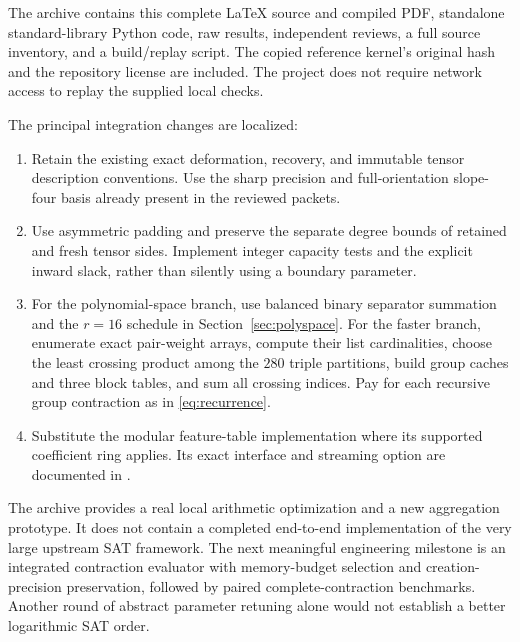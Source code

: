 \documentclass[11pt]{article}
\theoremstyle{definition}\newtheorem{definition}[theorem]{Definition}
\theoremstyle{remark}\newtheorem{remark}[theorem]{Remark}
\newcommand{\smallpath}[1]{{\small\path{#1}}}
\begin{document}
The archive contains this complete LaTeX source and compiled PDF, standalone
standard-library Python code, raw results, independent reviews, a full source
inventory, and a build/replay script. The copied reference kernel's original
hash and the repository license are included. The project does not require
network access to replay the supplied local checks.

The principal integration changes are localized:
\begin{enumerate}
\item Retain the existing exact deformation, recovery, and immutable tensor
description conventions. Use the sharp precision and full-orientation
slope-four basis already present in the reviewed packets.
\item Use asymmetric padding and preserve the separate degree bounds of
retained and fresh tensor sides. Implement integer capacity tests and the
explicit inward slack, rather than silently using a boundary parameter.
\item For the polynomial-space branch, use balanced binary separator
summation and the $r=16$ schedule in Section~\ref{sec:polyspace}. For the
faster branch, enumerate exact pair-weight arrays, compute their
list cardinalities, choose the least crossing product among the $280$
triple partitions, build group caches and three block tables, and sum all
crossing indices. Pay for each recursive group contraction as in
\eqref{eq:recurrence}.
\item Substitute the modular feature-table implementation where its supported
coefficient ring applies. Its exact interface and streaming option are
documented in \smallpath{audit/PRACTICAL_NOTES.md}.
\end{enumerate}

The archive provides a real local arithmetic optimization and a new aggregation
prototype. It does not contain a completed end-to-end implementation of the
very large upstream SAT framework. The next meaningful engineering milestone
is an integrated contraction evaluator with memory-budget selection and
creation-precision preservation, followed by paired complete-contraction
benchmarks. Another round of abstract parameter retuning alone would not
establish a better logarithmic SAT order.
\end{document}
